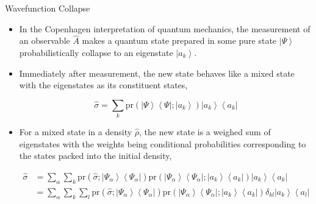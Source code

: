 \documentclass[9pt,handout]{beamer}
\newcommand{\pr}[0]{\text{pr}}
\begin{document}
\begin{frame}{Wavefunction Collapse}
\begin{itemize}
\item In the Copenhagen interpretation of quantum mechanics, the measurement of an observable $\widehat{A}$ makes a quantum state prepared in some pure state $\left\lvert \Psi \right\rangle$ probabilistically collapse to an eigenstate $\left\lvert a_k \right\rangle$.

\item Immediately after measurement, the new state behaves like a mixed state with the eigenstates as its constituent states,

$$\widehat{\sigma} = \sum_k \pr \left( \left\lvert \Psi \right\rangle \left\langle \Psi \right\rvert; \left\lvert a_k \right\rangle \right) \left\lvert a_k \right\rangle \left\langle a_k \right\rvert$$

\item For a mixed state in a density $\widehat{\rho}$, the new state is a weighed sum of eigenstates with the weights being conditional probabilities corresponding to the states packed into the initial density,

\begin{align*}
\widehat{\sigma} & = \sum_\alpha \sum_k \pr \left( \widehat{\sigma}; \left\lvert \Psi_\alpha \right\rangle \left\langle \Psi_\alpha \right\rvert \right) \pr \left( \left\lvert \Psi_\alpha \right\rangle \left\langle \Psi_\alpha \right\rvert; \left\lvert a_k \right\rangle \left\langle a_k \right\rvert \right) \left\lvert a_k \right\rangle \left\langle a_k \right\rvert \\
& = \sum_\alpha \sum_k \sum_l \pr \left( \widehat{\sigma}; \left\lvert \Psi_\alpha \right\rangle \left\langle \Psi_\alpha \right\rvert \right) \pr \left( \left\lvert \Psi_\alpha \right\rangle \left\langle \Psi_\alpha \right\rvert; \left\lvert a_k \right\rangle \left\langle a_k \right\rvert \right) \delta_{k l} \left\lvert a_k \right\rangle \left\langle a_l \right\rvert
\end{align*}
\end{itemize}
\end{frame}
\end{document}

